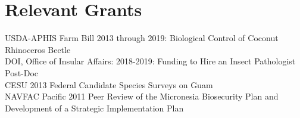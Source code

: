 \documentclass[letterpaper]{article}
\begin{document}
\section{Relevant Grants}

USDA-APHIS Farm Bill 2013 through 2019: Biological Control of Coconut Rhinoceros Beetle\\
DOI, Office of Insular Affairs: 2018-2019: Funding to Hire an Insect Pathologist Post-Doc \\
CESU 2013 Federal Candidate Species Surveys on Guam\\
NAVFAC Pacific 2011 Peer Review of the Micronesia Biosecurity Plan and Development of a Strategic Implementation Plan\\
\end{document}
